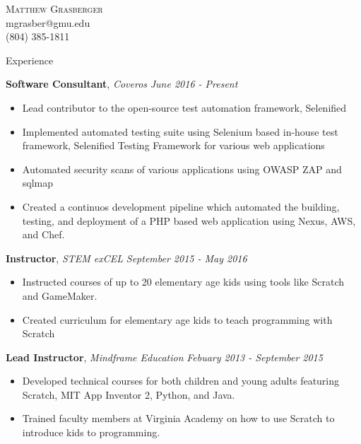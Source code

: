 \documentclass[9pt]{article}
\newenvironment{changemargin}[2]{%
  \begin{list}{}{%
    \setlength{\topsep}{0pt}%
    \setlength{\leftmargin}{#1}%
    \setlength{\rightmargin}{#2}%
    \setlength{\listparindent}{\parindent}%
    \setlength{\itemindent}{\parindent}%
    \setlength{\parsep}{\parskip}%
  }%
  \item[]}{\end{list}
}
\newcommand{\lineover}{
	\begin{changemargin}{-0.05in}{-0.05in}
		\vspace*{-8pt}
		\hrulefill \\
		\vspace*{-2pt}
	\end{changemargin}
}
\newcommand{\header}[1]{
	\begin{changemargin}{-0.5in}{-0.5in}
		\scshape{#1}\\
  	\lineover
	\end{changemargin}
}
\newcommand{\contact}[4]{
	\begin{changemargin}{-0.5in}{-0.5in}
		\begin{center}
			{\Large \scshape {#1}}\\ \smallskip
			{#2}\\ \smallskip 
			{#3}\\ \smallskip
			{#4}\smallskip
		\end{center}
	\end{changemargin}
}
\newenvironment{body} {
	\vspace*{-10pt}
	\begin{changemargin}{-0.25in}{-0.5in}
  }	
	{\end{changemargin}
}
\begin{document}
\contact{Matthew Grasberger}{mgrasber@gmu.edu}{(804) 385-1811}


%
%
%
%
\header{Experience}

\begin{body}
	
	\vspace{14pt}
	\textbf{Software Consultant}, \emph{Coveros} \hfill \emph{June 2016 - Present  }\\
	\vspace*{-4pt}
	\begin{itemize} \itemsep -0pt  %
		\item  Lead contributor to the open-source test automation framework, Selenified
		\item  Implemented automated testing suite using Selenium based in-house test framework, Selenified Testing Framework for various web applications
		\item  Automated security scans of various applications using OWASP ZAP and sqlmap
		\item  Created a continuos development pipeline which automated the building, testing, and deployment of a PHP based web application using Nexus, AWS, and Chef.
	\end{itemize}
	
	\textbf{Instructor}, \emph{STEM exCEL} \hfill \emph{September 2015 - May 2016  }\\
	\vspace*{-4pt}
	\begin{itemize} \itemsep -0pt  %
		\item  Instructed courses of up to 20 elementary age kids using tools like Scratch and GameMaker. 
		\item  Created curriculum for elementary age kids to teach programming with Scratch 
	\end{itemize}
	
	\textbf{Lead Instructor}, \emph{Mindframe Education} \hfill \emph{Febuary 2013 - September 2015}\\
	\vspace*{-4pt}
	\begin{itemize} \itemsep -0pt  %
		\item  Developed technical courses for both children and young adults featuring Scratch, MIT App Inventor 2, Python, and Java.
		\item Trained faculty members at Virginia Academy on how to use Scratch to introduce kids to programming.
	\end{itemize}		
	

\end{body}
\end{document}
